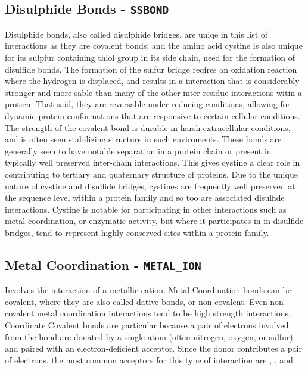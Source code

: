 \subsection{Disulphide Bonds - \texttt{SSBOND}}
Disulphide bonds, also called disulphide bridges, are uniqe in this list of interactions as they are covalent bonds; and the amino acid cystine is also unique for its sulpfur containing  thiol group in its side chain, need for the formation of disulfide bonds.
The formation of the sulfur bridge reqires an oxidation reaction where the hydrogen is displaced, and results in a  interaction that is considerably stronger and more sable than many of the other inter-residue interactions witin a protien. That said, they are reversable under reducing conditions, allowing for dynamic protein conformations that are responsive to certain cellular conditions. The strength of the covalent bond is durable in harsh extracellular conditions, and is often seen stabilizing structure in such enviroments. 
These bonds are generally seen to have notable separation in a protein chain or present in typically well preserved inter-chain interactions. 
This gives cystine a clear role in contributing to tertiary and quaternary structure of proteins. 
Due to the unique nature of cystine and disulfide bridges, cystines are frequently well preserved at the sequence level within a protein family and so too are associated disulfide interactions.
Cystine is notable for participating in other interactions such as metal coordination, or enzymatic activity, but where it participates in in disulfide bridges, tend to represent highly conserved sites within a protein family.

\subsection{Metal Coordination - \texttt{METAL\_ION}}
Involves the interaction of a metallic cation.
Metal Coordination bonds can be covalent, where they are also called dative bonds, or non-covalent.
Even non-covalent metal coordination interactions tend to be high strength interactions.
Coordinate Covalent bonds are particular because a pair of electrons involved from the bond are donated by a single atom (often nitrogen, oxygen, or sulfur) and paired with an electron-deficient acceptor. 
Since the donor contributes a pair of electrons, the most common acceptors for this type of interaction are , , and .

